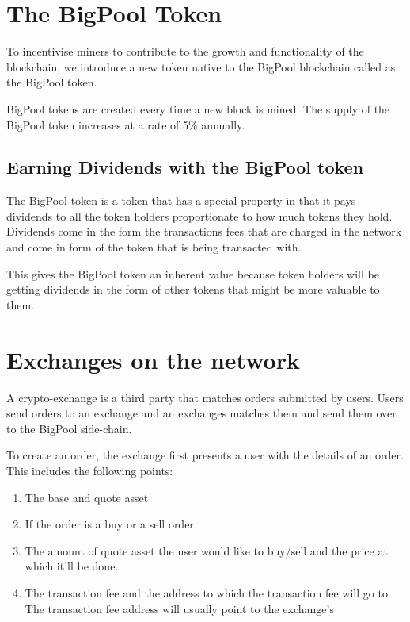 \documentclass{Bigpool}
\begin{document}

\section{The BigPool Token}
To incentivise miners to contribute to the growth and functionality of the blockchain, we introduce a new token native to the BigPool blockchain called as the BigPool token.

BigPool tokens are created every time a new block is mined. The supply of the BigPool token increases at a rate of 5\% annually. 

\subsection{Earning Dividends with the BigPool token}
The BigPool token is a token that has a special property in that it pays dividends to all the token holders proportionate to how much tokens they hold. Dividends come in the form the transactions fees that are charged in the network and come in form of the token that is being transacted with.

This gives the BigPool token an inherent value because token holders will be getting dividends in the form of other tokens  that might be more valuable to them. 

\section{Exchanges on the network}
A crypto-exchange is a third party that matches orders submitted by users. Users send orders to an exchange and an exchanges matches them and send them over to the BigPool side-chain.

To create an order, the exchange first presents a user with the details of an order. This includes the following points: 
\begin{enumerate}
	\item The base and quote asset
	\item If the order is a buy or a sell order
	\item The amount of quote asset the user would like to buy/sell and the price at which it’ll be done.
	\item The transaction fee and the address to which the transaction fee will go to. The transaction fee address will usually point to the exchange’s 
\end{enumerate}
\end{document}

